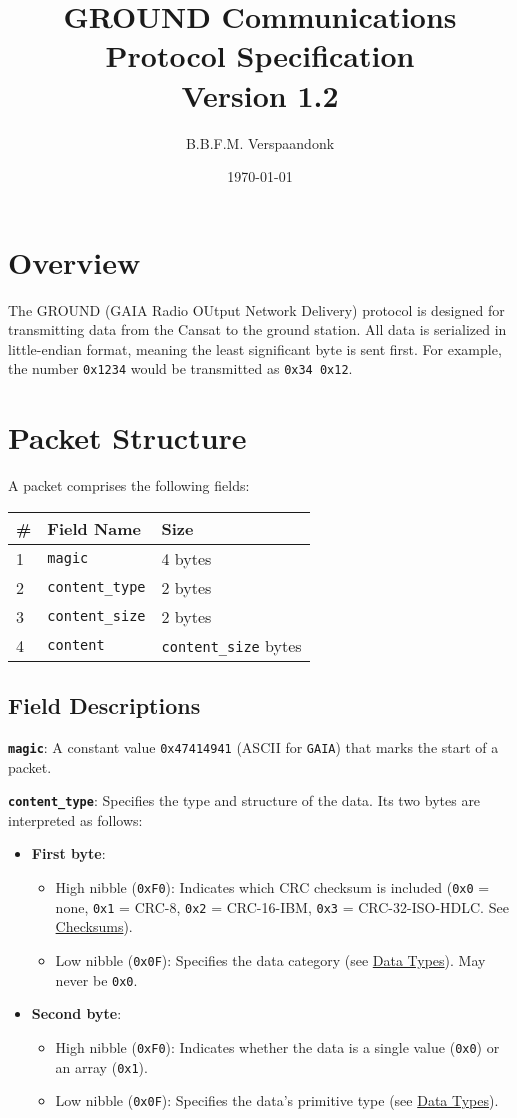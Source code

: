 \documentclass[a4paper]{article}
\title{GROUND Communications Protocol Specification\\ \large Version 1.2}
\date{\today}
\author{B.B.F.M. Verspaandonk}
\begin{document}
\maketitle

\section*{Overview}
The GROUND (GAIA Radio OUtput Network Delivery) protocol is designed for transmitting data from the Cansat to the ground station. All data is serialized in little-endian format, meaning the least significant byte is sent first. For example, the number \texttt{0x1234} would be transmitted as \texttt{0x34 0x12}.

\section*{Packet Structure}
A packet comprises the following fields:
\begin{longtable}{@{}lll@{}}
\toprule
\# & Field Name         & Size                \\
\midrule
1  & \texttt{magic}      & 4 bytes             \\
2  & \texttt{content\_type} & 2 bytes             \\
3  & \texttt{content\_size} & 2 bytes             \\
4  & \texttt{content}     & \texttt{content\_size} bytes \\
\bottomrule
\end{longtable}

\subsection*{Field Descriptions}
\textbf{\texttt{magic}}: A constant value \texttt{0x47414941} (ASCII for \texttt{GAIA}) that marks the start of a packet.

\textbf{\texttt{content\_type}}: Specifies the type and structure of the data. Its two bytes are interpreted as follows:
\begin{itemize}
  \item \textbf{First byte}:
  \begin{itemize}
    \item High nibble (\texttt{0xF0}): Indicates which CRC checksum is included (\texttt{0x0} = none, \texttt{0x1} = CRC-8, \texttt{0x2} = CRC-16-IBM, \texttt{0x3} = CRC-32-ISO-HDLC. See \hyperref[checksums]{Checksums}).
    \item Low nibble (\texttt{0x0F}): Specifies the data category  (see \hyperref[data-types]{Data Types}). May never be \texttt{0x0}.
  \end{itemize}
  \item \textbf{Second byte}:
  \begin{itemize}
    \item High nibble (\texttt{0xF0}): Indicates whether the data is a single value (\texttt{0x0}) or an array (\texttt{0x1}).
    \item Low nibble (\texttt{0x0F}): Specifies the data's primitive type (see \hyperref[data-types]{Data Types}).
  \end{itemize}
\end{itemize}
\end{document}
